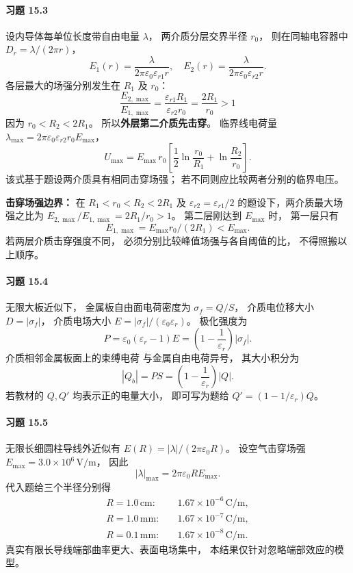 \paragraph{习题 15.3}
设内导体每单位长度带自由电量 \(\lambda\)，
两介质分层交界半径 \(r_0\)，
则在同轴电容器中
\(D_r=\lambda/(2\pi r)\)，
\[
 E_1(r)=\frac{\lambda}{2\pi\varepsilon_0
 \varepsilon_{r1}r},\quad
 E_2(r)=\frac{\lambda}{2\pi\varepsilon_0
 \varepsilon_{r2}r}.
\]
各层最大的场强分别发生在 \(R_1\) 及 \(r_0\)：
\[
 \frac{E_{2,\max}}{E_{1,\max}}
 =\frac{\varepsilon_{r1}R_1}
 {\varepsilon_{r2}r_0}
 =\frac{2R_1}{r_0}>1
\]
因为 \(r_0<R_2<2R_1\)。
所以\textbf{外层第二介质先击穿}。
临界线电荷量
\(\lambda_{\max}=2\pi\varepsilon_0
 \varepsilon_{r2}r_0E_{\max}\)，
\[
 \boxed{U_{\max}=E_{\max}\,r_0
 \left[\frac12\ln\frac{r_0}{R_1}
 +\ln\frac{R_2}{r_0}\right]}.
\]
该式基于题设两介质具有相同击穿场强；
若不同则应比较两者分别的临界电压。

\textbf{击穿场强边界：}
在 \(R_1<r_0<R_2<2R_1\) 及
\(\varepsilon_{r2}=\varepsilon_{r1}/2\)
的题设下，两介质最大场强之比为
\(E_{2,\max}/E_{1,\max}=2R_1/r_0>1\)。
第二层刚达到 \(E_{\max}\) 时，
第一层只有
\[
 \boxed{E_{1,\max}=E_{\max}r_0/(2R_1)
 <E_{\max}}.
\]
若两层介质击穿强度不同，
必须分别比较峰值场强与各自阈值的比，
不得照搬以上顺序。


\paragraph{习题 15.4}
无限大板近似下，
金属板自由面电荷密度为
\(\sigma_f=Q/S\)，
介质电位移大小
\(D=|\sigma_f|\)，
介质电场大小
\(E=|\sigma_f|/(\varepsilon_0\varepsilon_r)\)。
极化强度为
\[
 P=\varepsilon_0(\varepsilon_r-1)E
 =\left(1-\frac1{\varepsilon_r}\right)
 |\sigma_f|.
\]
介质相邻金属板面上的束缚电荷
与金属自由电荷异号，
其大小积分为
\[
 \boxed{|Q_b|=PS
 =\left(1-\frac1{\varepsilon_r}\right)|Q|}.
\]
若教材的 \(Q,Q'\) 均表示正的电量大小，
即可写为题给 \(Q'=(1-1/\varepsilon_r)Q\)。

\paragraph{习题 15.5}
无限长细圆柱导线外近似有
\(E(R)=|\lambda|/(2\pi\varepsilon_0R)\)。
设空气击穿场强
\(E_{\max}=3.0\times10^6\,\mathrm{V/m}\)，
因此
\[
 \boxed{|\lambda|_{\max}
 =2\pi\varepsilon_0R E_{\max}}.
\]
代入题给三个半径分别得
\[
 \boxed{\begin{aligned}
 R=1.0\,\mathrm{cm}:&\quad1.67\times10^{-6}\,\mathrm{C/m},\\
 R=1.0\,\mathrm{mm}:&\quad1.67\times10^{-7}\,\mathrm{C/m},\\
 R=0.1\,\mathrm{mm}:&\quad1.67\times10^{-8}\,\mathrm{C/m}.
 \end{aligned}}
\]
真实有限长导线端部曲率更大、表面电场集中，
本结果仅针对忽略端部效应的模型。

